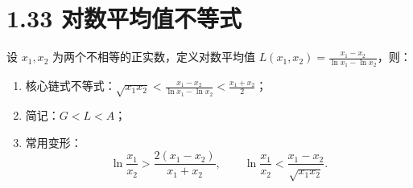 \documentclass{article}
\begin{document}
\section*{1.33 对数平均值不等式}
设 \( x_1,x_2 \) 为两个不相等的正实数，定义对数平均值 \( L(x_1,x_2)=\frac{x_1-x_2}{\ln x_1-\ln x_2} \)，则：
\begin{enumerate}
    \item 核心链式不等式：\( \sqrt{x_1x_2} < \frac{x_1-x_2}{\ln x_1-\ln x_2} < \frac{x_1+x_2}{2} \)；
    \item 简记：\( G < L < A \)；
    \item 常用变形：
    \[
    \ln\frac{x_1}{x_2} > \frac{2(x_1-x_2)}{x_1+x_2},\qquad \ln\frac{x_1}{x_2} < \frac{x_1-x_2}{\sqrt{x_1x_2}}.
    \]
\end{enumerate}
\end{document}
